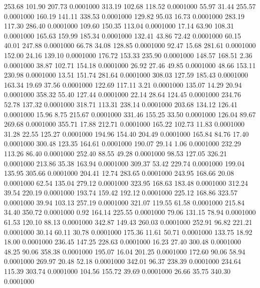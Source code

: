  253.68  101.90  207.73   0.0001000
 313.19  102.68  118.52   0.0001000
  55.97   31.44  255.57   0.0001000
 160.19  141.11  338.53   0.0001000
 129.82   95.03   16.73   0.0001000
 283.19  117.30  286.40   0.0001000
 109.60  150.35  113.04   0.0001000
  17.14   63.90  108.31   0.0001000
 165.63  159.99  185.34   0.0001000
 132.41   43.86   72.42   0.0001000
  60.15   40.01  247.88   0.0001000
  66.78   34.08  128.85   0.0001000
  92.47   15.68  281.61   0.0001000
 152.00   24.16  139.10   0.0001000
 176.72  153.33  235.90   0.0001000
 148.57  168.51    2.36   0.0001000
  38.87  102.71  154.18   0.0001000
  26.92   27.46   49.85   0.0001000
  48.66  153.11  230.98   0.0001000
  13.51  151.74  281.64   0.0001000
 308.03  127.59  185.43   0.0001000
 163.34   19.69   37.56   0.0001000
 122.69  117.11    3.21   0.0001000
 135.07   14.29   20.94   0.0001000
 358.32   55.40  127.44   0.0001000
  22.14   28.64  124.45   0.0001000
 234.76   52.78  137.32   0.0001000
 318.71  113.31  238.14   0.0001000
 203.68  134.12  126.41   0.0001000
  15.96    8.75  215.67   0.0001000
 331.46  155.25   33.50   0.0001000
 126.04   89.67  269.68   0.0001000
 355.71   17.88  212.71   0.0001000
 165.22  102.73   11.83   0.0001000
  31.28   22.55  125.27   0.0001000
 194.96  154.40  204.49   0.0001000
 165.84   84.76   17.40   0.0001000
 300.48  123.35  164.61   0.0001000
 190.07   29.14    1.06   0.0001000
 232.29  113.26   86.40   0.0001000
 252.40   88.55   49.28   0.0001000
  98.53  127.05  326.21   0.0001000
 213.86   35.38  163.94   0.0001000
 309.37   53.42  229.74   0.0001000
 199.04  135.95  305.66   0.0001000
 204.41   12.74  283.65   0.0001000
 243.95  168.66   20.08   0.0001000
  62.54  135.04  279.12   0.0001000
 323.95  168.63  183.48   0.0001000
 312.24   39.54  220.19   0.0001000
 193.74  159.42  192.12   0.0001000
 225.12  168.86  323.57   0.0001000
  39.94  103.13  257.19   0.0001000
 321.07  119.55   61.58   0.0001000
 215.84   34.40  350.72   0.0001000
   0.92  164.14  225.55   0.0001000
  79.06  131.15   78.94   0.0001000
  61.53  120.10   88.13   0.0001000
 342.87  149.43  260.03   0.0001000
 252.91   96.82  221.21   0.0001000
  30.14   60.11   30.78   0.0001000
 175.36   11.61   50.71   0.0001000
 133.75   18.92   18.00   0.0001000
 236.45  147.25  228.63   0.0001000
  16.23   27.40  300.48   0.0001000
  48.25   90.06  358.38   0.0001000
 195.07   16.04  201.25   0.0001000
 172.60   90.06   58.94   0.0001000
 269.97   20.48   52.18   0.0001000
 342.01   96.37  238.39   0.0001000
 234.64  115.39  303.74   0.0001000
 104.56  155.72   39.69   0.0001000
  26.66   35.75  340.30   0.0001000
